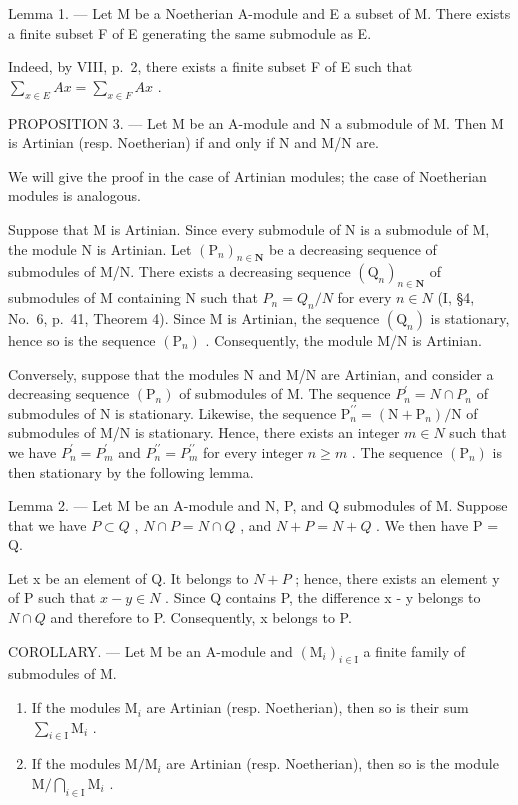 Lemma 1. --- Let M be a Noetherian A-module and E a subset of M. There exists a finite subset F of E generating the same submodule as E.

Indeed, by VIII, p.~2, there exists a finite subset F of E such that \(\sum_{x\in E}Ax=\sum_{x\in F}Ax\) .

PROPOSITION 3. --- Let M be an A-module and N a submodule of M. Then M is Artinian (resp. Noetherian) if and only if N and M/N are.

We will give the proof in the case of Artinian modules; the case of Noetherian modules is analogous.

Suppose that M is Artinian. Since every submodule of N is a submodule of M, the module N is Artinian. Let \((\mathrm{P}_{n})_{n\in\mathbf{N}}\) be a decreasing sequence of submodules of M/N. There exists a decreasing sequence \((\mathrm{Q}_{n})_{n\in\mathbf{N}}\) of submodules of M containing N such that \(P_{n}=Q_{n}/N\) for every \(n\in N\) (I, §4, No.~6, p.~41, Theorem 4). Since M is Artinian, the sequence \((\mathrm{Q}_{n})\) is stationary, hence so is the sequence \((\mathrm{P}_{n})\) . Consequently, the module M/N is Artinian.

Conversely, suppose that the modules N and M/N are Artinian, and consider a decreasing sequence \((\mathrm{P}_{n})\) of submodules of M. The sequence \(P_{n}^{\prime} = N \cap P_{n}\) of submodules of N is stationary. Likewise, the sequence \(\mathrm{P}_{n}^{\prime\prime} = (\mathrm{N} + \mathrm{P}_{n})/\mathrm{N}\) of submodules of M/N is stationary. Hence, there exists an integer \(m \in N\) such that we have \(P_{n}^{\prime} = P_{m}^{\prime}\) and \(P_{n}^{\prime\prime} = P_{m}^{\prime\prime}\) for every integer \(n \geqslant m\) . The sequence \((\mathrm{P}_{n})\) is then stationary by the following lemma.

Lemma 2. --- Let M be an A-module and N, P, and Q submodules of M. Suppose that we have \(P \subset Q\) , \(N \cap P = N \cap Q\) , and \(N + P = N + Q\) . We then have P = Q.

Let x be an element of Q. It belongs to \(N + P\) ; hence, there exists an element y of P such that \(x - y \in N\) . Since Q contains P, the difference x - y belongs to \(N \cap Q\) and therefore to P. Consequently, x belongs to P.

COROLLARY. --- Let M be an A-module and \((\mathrm{M}_{i})_{i\in\mathrm{I}}\) a finite family of submodules of M.

\begin{enumerate}
\def\labelenumi{\alph{enumi})}
\item
  If the modules \(\mathrm{M}_i\) are Artinian (resp. Noetherian), then so is their sum \(\sum_{i\in \mathrm{I}}\mathrm{M}_i\) .
\item
  If the modules \(\mathrm{M} / \mathrm{M}_i\) are Artinian (resp. Noetherian), then so is the module \(\mathrm{M} / \bigcap_{i\in \mathrm{I}}\mathrm{M}_i\) .
\end{enumerate}

